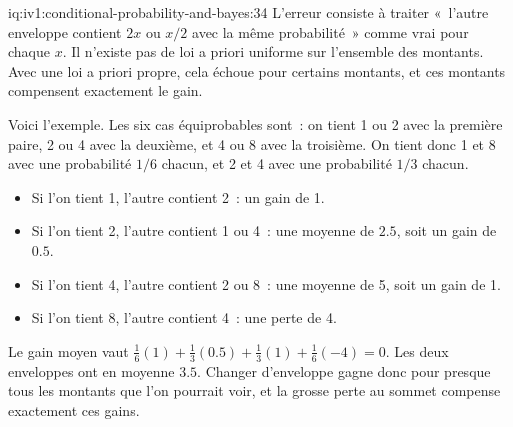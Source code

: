\begin{solution}{iq:iv1:conditional-probability-and-bayes:34}
L'erreur consiste à traiter «~l'autre enveloppe contient $2x$ ou $x/2$ avec la même probabilité~» comme vrai pour chaque $x$. Il n'existe pas de loi a priori uniforme sur l'ensemble des montants. Avec une loi a priori propre, cela échoue pour certains montants, et ces montants compensent exactement le gain.

Voici l'exemple. Les six cas équiprobables sont~: on tient 1 ou 2 avec la première paire, 2 ou 4 avec la deuxième, et 4 ou 8 avec la troisième. On tient donc 1 et 8 avec une probabilité $1/6$ chacun, et 2 et 4 avec une probabilité $1/3$ chacun.
\begin{itemize}
\item Si l'on tient 1, l'autre contient 2~: un gain de 1.
\item Si l'on tient 2, l'autre contient 1 ou 4~: une moyenne de $2.5$, soit un gain de $0.5$.
\item Si l'on tient 4, l'autre contient 2 ou 8~: une moyenne de 5, soit un gain de 1.
\item Si l'on tient 8, l'autre contient 4~: une perte de 4.
\end{itemize}
Le gain moyen vaut $\tfrac16(1) + \tfrac13(0.5) + \tfrac13(1) + \tfrac16(-4) = 0$. Les deux enveloppes ont en moyenne $3.5$. Changer d'enveloppe gagne donc pour presque tous les montants que l'on pourrait voir, et la grosse perte au sommet compense exactement ces gains.

\end{solution}

